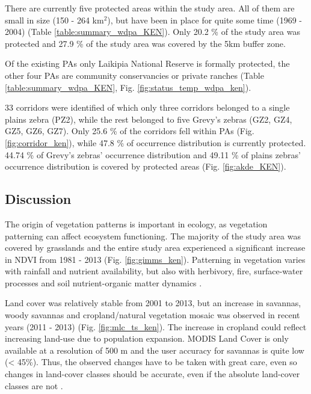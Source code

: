 \documentclass[12pt,a4paper, twoside, english]{article}
\begin{document}

There are currently five protected areas within the study area. All of them are small in size (150 - 264 km$^{2}$), but have been in place for quite some time (1969 - 2004) (Table \ref{table:summary_wdpa_KEN}). Only 20.2 \% of the study area was protected and 27.9 \% of the study area was covered by the 5km buffer zone.



Of the existing PAs only Laikipia National Reserve is formally protected, the other four PAs are community conservancies or private ranches (Table \ref{table:summary_wdpa_KEN}, Fig. \ref{fig:status_temp_wdpa_ken}).

33 corridors were identified of which only three corridors belonged to a single plains zebra (PZ2), while the rest belonged to five Grevy's zebras (GZ2, GZ4, GZ5, GZ6, GZ7). Only 25.6 \% of the corridors fell within PAs (Fig. \ref{fig:corridor_ken}), while 47.8 \% of occurrence distribution is currently protected. 44.74 \% of Grevy's zebras' occurrence distribution and 49.11 \% of plains zebras' occurrence distribution is covered by protected areas (Fig. \ref{fig:akde_KEN}).

\subsection{Discussion}


The origin of vegetation patterns is important in ecology, as vegetation patterning can affect ecosystem functioning. The majority of the study area was covered by grasslands and the entire study area experienced a significant increase in NDVI from 1981 - 2013 (Fig. \ref{fig:gimms_ken}). Patterning in vegetation varies with rainfall and nutrient availability, but also with herbivory, fire, surface-water processes and soil nutrient-organic matter dynamics \citep{DeKnegt2008}.

Land cover was relatively stable from 2001 to 2013, but an increase in savannas, woody savannas and cropland/natural vegetation mosaic was observed in recent years (2011 - 2013) (Fig. \ref{fig:mlc_ts_ken}). The increase in cropland could reflect increasing land-use due to population expansion. MODIS Land Cover is only available at a resolution of 500 m and the user accuracy for savannas is quite low (< 45\%). Thus, the observed changes have to be taken with great care, even so changes in land-cover classes should be accurate, even if the absolute land-cover classes are not \citep{Pfeifer2012a}.
\end{document}
